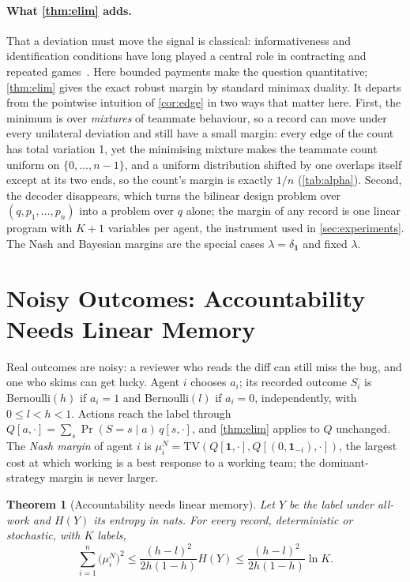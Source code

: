 \documentclass[sigconf,anonymous,acmthm=false]{aamas}
\theoremstyle{acmplain}
\newtheorem{theorem}{Theorem}
\theoremstyle{acmdefinition}
\newcommand{\TV}{\mathrm{TV}}
\begin{document}
\paragraph{What \cref{thm:elim} adds.} That a deviation must move the signal is classical:
informativeness and identification conditions have long played a central role in
contracting and repeated games~\cite{holmstrom1979moral,fudenberg1994folk}.
Here bounded payments make the question quantitative; \cref{thm:elim} gives
the exact robust margin by standard minimax duality. It
departs from the pointwise intuition of \cref{cor:edge} in two ways that matter here. First,
the minimum is over \emph{mixtures} of teammate behaviour, so a record can move under every
unilateral deviation and still have a small margin: every edge of the count has total
variation 1, yet the minimising mixture makes the teammate count uniform on
$\{0,\dots,n-1\}$, and a uniform distribution shifted by one overlaps itself except at its
two ends, so the count's margin is exactly $1/n$ (\cref{tab:alpha}). Second, the decoder
disappears, which turns the bilinear design problem over $(q,p_1,\dots,p_n)$ into a problem
over $q$ alone; the margin of any record is one linear program with $K+1$ variables per
agent, the instrument used in \cref{sec:experiments}. The Nash and Bayesian margins are the
special cases $\lambda=\delta_{\mathbf1}$ and fixed $\lambda$.

\section{Noisy Outcomes: Accountability Needs Linear Memory}\label{sec:noisy}

Real outcomes are noisy: a reviewer who reads the diff can still miss the bug, and one who
skims can get lucky. Agent $i$ chooses $a_i$; its recorded outcome $S_i$ is Bernoulli$(h)$ if
$a_i=1$ and Bernoulli$(l)$ if $a_i=0$, independently, with $0\le l<h<1$. Actions reach the
label through $Q[a,\cdot]=\sum_s\Pr(S=s\mid a)\,q[s,\cdot]$, and \cref{thm:elim} applies to
$Q$ unchanged. The \emph{Nash margin} of agent $i$ is
$\mu_i^N=\TV(Q[\mathbf1,\cdot],Q[(0,\mathbf1_{-i}),\cdot])$, the largest cost at which
working is a best response to a working team; the dominant-strategy margin is never larger.

\begin{theorem}[Accountability needs linear memory]\label{thm:noisy}
Let $Y$ be the label under all-work and $H(Y)$ its entropy in nats. For every record,
deterministic or stochastic, with $K$ labels,
\[ \sum_{i=1}^n\big(\mu_i^N\big)^2\le\frac{(h-l)^2}{2h(1-h)}H(Y)\le\frac{(h-l)^2}{2h(1-h)}\ln K. \]
\end{theorem}
\end{document}
